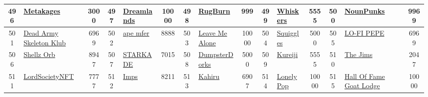 \begin{table*}[]
{\begin{tabular}{|c|l|c|c|l|c|c|l|c|c|l|c|c|l|c|}
        496   & \href{http://www.metakages.com}{Metakages}                                         & 3000              & 497   & \href{https://www.dreamlandgenesis.com/}{Dreamlands}                                              & 10000             & 498   & \href{http://rugburner.io}{RugBurn}                                               & 999               & 499   & \href{https://thegreatpond.xyz}{Whiskers}                                     & 5555              & 500   & \href{https://nounpunks.wtf}{NounPunks}                                                   & 9969                                    \\ \hline
        501   & \href{https://www.thedeadarmyskeletonklub.army/}{Dead Army Skeleton Klub}          & 6969              & 502   & \href{http://apemfers.com}{ape mfer}                                                              & 8888              & 503   & \href{https://leavemealone.lol/}{Leave Me Alone}                                  & 10000             & 504   & \href{http://squiggles.app}{Squiggles}                                        & 5000              & 505   & \href{http://lofipepe.com}{LO-FI PEPE}                                                    & 6969                                    \\ \hline
        506   & \href{https://shellzorb.io}{Shellz Orb}                                            & 8947              & 507   & \href{http://starkade.com}{STARKADE}                                                              & 7015              & 508   & \href{http://www.dumpsterdorks.com}{DumpsterDorks}                                & 5000              & 509   & \href{https://www.kureijinft.com/}{Kureiji}                                   & 5555              & 510   & \href{https://thejims.xyz}{The Jims}                                                      & 2047                                    \\ \hline
        511   & \href{https://lordsocietynft.com/}{LordSocietyNFT}                                 & 7777              & 512   & \href{http://supernfty.com}{Imps}                                                                 & 8211              & 513   & \href{http://kahiru.io}{Kahiru}                                                   & 6907              & 514   & \href{https://lonelypop.com}{LonelyPop}                                       & 10000             & 515   & \href{https://hofgoatlodge.com}{Hall Of Fame Goat Lodge}                                  & 10000                                   \\ \hline

\end{tabular}}
\end{table*}

